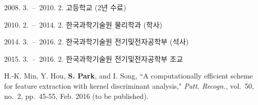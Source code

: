 \documentclass[master,english,final]{kaist-ucs}
\begin{document}
\begin{education}
    \item[2008. 3.\ --\ 2010. 2.] 고등학교 (2년 수료)
    \item[2010. 2.\ --\ 2014. 2.] 한국과학기술원 물리학과 (학사)
    \item[2014. 3.\ --\ 2016. 2.] 한국과학기술원 전기및전자공학부 (석사)
\end{education}

\begin{career}
    \item[2015. 3.\ --\ 2016. 2.] 한국과학기술원 전기및전자공학부 조교
\end{career}


\begin{publication}
    \item H.-K. Min, Y. Hou, {\bf S. Park}, and I. Song,
    ``A computationally efficient scheme for feature extraction with kernel discriminant analysis,"
    \textit{Patt. Recogn.}, vol.~50, no.~2, pp.~45-55, Feb. 2016 (to be published).
\end{publication}

\label{paperlastpagelabel}     %
\end{document}
